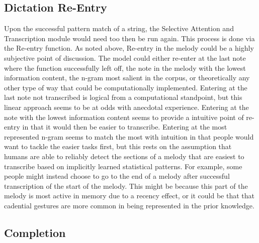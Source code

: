 \documentclass[]{book}
\begin{document}
\hypertarget{dictation-re-entry}{%
\subsection{Dictation Re-Entry}\label{dictation-re-entry}}

Upon the successful pattern match of a string, the Selective Attention and Transcription module would need too then be run again.
This process is done via the Re-entry function.
As noted above, Re-entry in the melody could be a highly subjective point of discussion.
The model could either re-enter at the last note where the function successfully left off, the note in the melody with the lowest information content, the n-gram most salient in the corpus, or theoretically any other type of way that could be computationally implemented.
Entering at the last note not transcribed is logical from a computational standpoint, but this linear approach seems to be at odds with anecdotal experience.
Entering at the note with the lowest information content seems to provide a intuitive point of re-entry in that it would then be easier to transcribe.
Entering at the most represented n-gram seems to match the most with intuition in that people would want to tackle the easier tasks first, but this rests on the assumption that humans are able to reliably detect the sections of a melody that are easiest to transcribe based on implicitly learned statistical patterns.
For example, some people might instead choose to go to the end of a melody after successful transcription of the start of the melody.
This might be because this part of the melody is most active in memory due to a recency effect, or it could be that that cadential gestures are more common in being represented in the prior knowledge.

\hypertarget{completion}{%
\subsection{Completion}\label{completion}}
\end{document}
